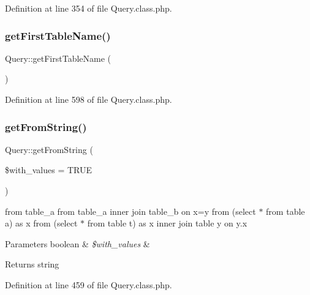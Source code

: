Definition at line 354 of file Query.\+class.\+php.

\mbox{\label{classQuery_a440208634d58f7dbbf6c5220133b21c0}} 
\subsubsection{\texorpdfstring{get\+First\+Table\+Name()}{getFirstTableName()}}
{\footnotesize\ttfamily Query\+::get\+First\+Table\+Name (\begin{DoxyParamCaption}{ }\end{DoxyParamCaption})}



Definition at line 598 of file Query.\+class.\+php.

\mbox{\label{classQuery_a804cc37929736e0fea414721b90af410}} 
\subsubsection{\texorpdfstring{get\+From\+String()}{getFromString()}}
{\footnotesize\ttfamily Query\+::get\+From\+String (\begin{DoxyParamCaption}\item[{}]{\$with\+\_\+values = {\ttfamily TRUE} }\end{DoxyParamCaption})}

from table\+\_\+a from table\+\_\+a inner join table\+\_\+b on x=y from (select $\ast$ from table a) as x from (select $\ast$ from table t) as x inner join table y on y.\+x 
\begin{DoxyParams}[1]{Parameters}
boolean & {\em \$with\+\_\+values} & \\
\hline
\end{DoxyParams}
\begin{DoxyReturn}{Returns}
string 
\end{DoxyReturn}


Definition at line 459 of file Query.\+class.\+php.

\mbox{\label{classQuery_ab5a30b706a9e963bf638409a567ff8d9}} 
